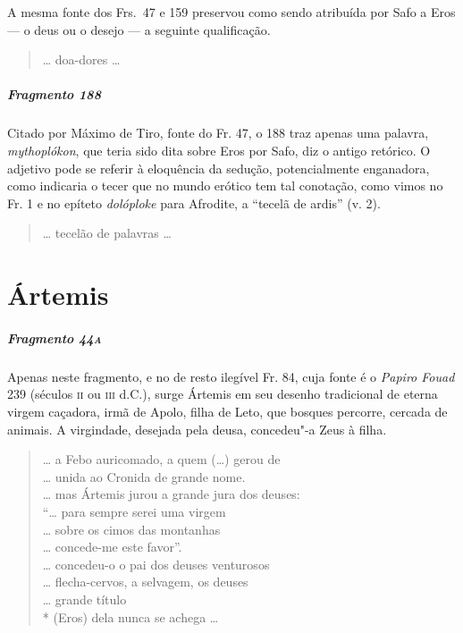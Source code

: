 {{\small A mesma fonte dos Frs.~47 e 159 preservou como sendo atribuída por Safo a Eros --- o deus ou o desejo --- a seguinte qualificação.}

\begin{verse}
\ldots{} doa-dores \ldots{} 
\end{verse}

\paragraph{Fragmento 188}

{\small Citado por Máximo de Tiro, fonte do Fr. 47, o 188 traz apenas uma palavra, \textit{mythoplókon}, que teria sido dita sobre Eros por Safo, diz o antigo retórico. O adjetivo pode se referir à eloquência da sedução, potencialmente enganadora, como indicaria o tecer que no mundo erótico tem tal conotação, como vimos no Fr. 1 e no epíteto \textit{dolóploke} para Afrodite, a ``tecelã de ardis'' (v. 2).}

\begin{verse}
\ldots{} tecelão de palavras \ldots{}
\end{verse}

\chapter{Ártemis}

\paragraph{Fragmento 44\textsc{a}}

{\small Apenas neste fragmento, e no de resto ilegível Fr. 84, cuja fonte é o \textit{Papiro Fouad }239 (séculos \textsc{ii} ou
\textsc{iii} d.C.), surge Ártemis em seu desenho tradicional de eterna virgem caçadora,
irmã de Apolo, filha de Leto, que bosques percorre, cercada de animais. A
virgindade, desejada pela deusa, concedeu"-a Zeus à filha.}

\begin{verse}
\ldots{} a Febo auricomado, a quem (\ldots{}) gerou de \\
\ldots{} unida ao Cronida de grande nome.\\
\ldots{} mas Ártemis jurou a grande jura dos deuses:\\
``\ldots{} para sempre serei uma virgem\\
\ldots{} sobre os cimos das montanhas\\
\ldots{} concede-me este favor''.\\
\ldots{} concedeu-o o pai dos deuses venturosos\\
\ldots{} flecha-cervos, a selvagem, os deuses\\
\ldots{} grande título\\*
(Eros) dela nunca se achega \ldots{}


\end{verse}}
